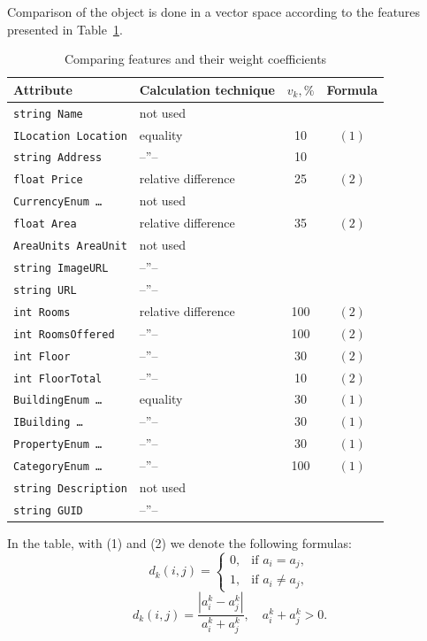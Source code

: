 \documentclass[conference,a4]{IEEEtran}
\begin{document}
Comparison of the object is done in a vector space according to the features presented in Table~\ref{tab:cmp}.
\begin{table}[tb]
  \caption{Comparing features and their weight coefficients}
  \label{tab:cmp}
  \footnotesize
  \centering
  \begin{tabular}{|l|l|c|c|}
    \hline
    Attribute & Calculation technique & $v_k, \%$ & Formula \\
    \hline
\texttt{string Name} & not used & & \\
    \texttt{ILocation Location} & equality & 10 & $(1)$
    \\
\texttt{string Address} & --''-- & 10 & \\
\texttt{float Price} & relative difference & 25 & $(2)$\\
\texttt{CurrencyEnum \ldots} & not used  & & \\
\texttt{float Area} & relative difference  & 35 & $(2)$\\
\texttt{AreaUnits AreaUnit} & not used & &\\
\texttt{string ImageURL} & --''-- & & \\
\texttt{string URL} & --''-- & & \\
\texttt{int Rooms}  & relative difference  & 100 & $(2)$\\
\texttt{int RoomsOffered} &  --''--   & 100 & $(2)$\\
\texttt{int Floor}  &  --''--   & 30 & $(2)$\\
\texttt{int FloorTotal}  &  --''--   & 10 & $(2)$\\
\texttt{BuildingEnum \ldots}  & equality & 30 & $(1)$\\
\texttt{IBuilding \ldots{}}  & --''-- & 30 &  $(1)$\\
\texttt{PropertyEnum \ldots} & --''-- & 30 &  $(1)$\\
\texttt{CategoryEnum \ldots} & --''-- & 100 &  $(1)$\\
\texttt{string Description} & not used & & \\
    \texttt{string GUID} & --''-- & & \\
    \hline
  \end{tabular}
\end{table}

In the table, with (1) and (2) we denote the following formulas:
\[
  d_k(i,j) = \left\{
                                                          \begin{array}{ll}
                                                            0, & \mbox{if\ \ } a_i=a_j,\\
                                                            1, & \mbox{if\ \ } a_i\neq a_j,
                                                          \end{array}
                                                          \right.
  \tag{1}
\]
\[
  d_k(i,j) = \frac{|a_i^k-a_j^k|}{a_i^k+a_j^k},\quad a_i^k+a_j^k>0.
  \tag{2}
\]
\end{document}
